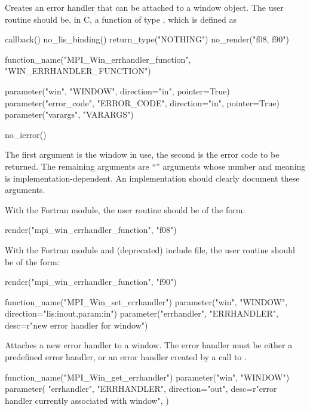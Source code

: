 Creates an error handler that can be attached to a window object.
The user routine should be, in C, a
function of type
,
which is defined as

%
\begin{mpi-binding}
    callback()
    no_lis_binding()
    return_type("NOTHING")
    no_render("f08, f90")
    
    function_name("MPI_Win_errhandler_function", "WIN_ERRHANDLER_FUNCTION")
    
    parameter("win", "WINDOW", direction="in", pointer=True)
    parameter("error_code", "ERROR_CODE", direction="in", pointer=True)
    parameter("varargs", "VARARGS")
    
    no_ierror()
\end{mpi-binding}

The first argument is the window in use, the second
is the error code to be returned.
The remaining arguments are ``'' arguments
whose number and meaning is implementation-dependent.  An implementation
should clearly document these arguments.

\noindent
With the Fortran  module, the user routine  should be of the form:

\begin{mpi-binding}
    render("mpi_win_errhandler_function", "f08")
\end{mpi-binding}

\noindent
With the Fortran  module and (deprecated)  include file,
the user routine  should be of the form:

\begin{mpi-binding}
    render("mpi_win_errhandler_function", "f90")
\end{mpi-binding}

%
%
\begin{mpi-binding}
    function_name("MPI_Win_set_errhandler")
    parameter("win", "WINDOW", direction="lis:inout,param:in")
    parameter("errhandler", "ERRHANDLER", desc=r"new error handler for window")
\end{mpi-binding}

Attaches a new error handler to a window.  The error handler must be
either a predefined error
handler, or an error handler created by a call to
.

%
%
\begin{mpi-binding}
    function_name("MPI_Win_get_errhandler")
    parameter("win", "WINDOW")
    parameter(
        "errhandler",
        "ERRHANDLER",
        direction="out",
        desc=r"error handler currently associated with window",
    )
\end{mpi-binding}

